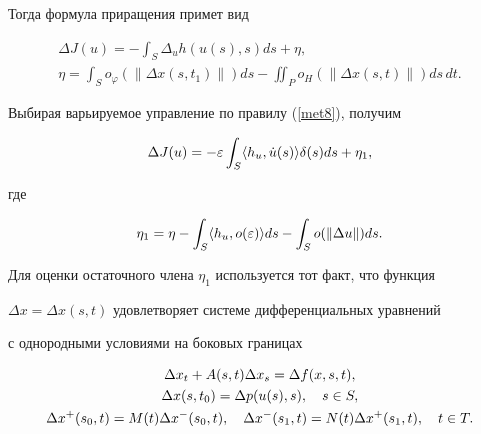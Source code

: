 Тогда формула приращения примет вид


\begin{gather*}


\Delta J(u)=-\int_S \Delta_u h(u(s),s) ds +\eta, \\


%


\eta=\int_S o_\varphi (\| \Delta x(s,t_1) \|) ds -


\iint_P o_H (\|\Delta x (s,t)\| ) ds\, dt.


\end{gather*}





Выбирая варьируемое управление по правилу (\ref{met8}), получим


\begin{equation}


\Delta J(u)=-\varepsilon \int_S \la h_u,\Dot{u} (s)\ra\delta (s) ds + \eta_1,


\label{met11}


\end{equation}


где 


$$


\eta_1=\eta-\int_S \la h_u,o(\varepsilon)\ra ds


-\int_S o( \| \Delta u \| ) ds.


$$





Для оценки остаточного члена $\eta_1$ используется тот факт, что функция


$\Delta x=\Delta x(s,t)$ удовлетворяет системе дифференциальных уравнений


с однородными условиями на боковых границах


\begin{gather}


\Delta x_t +A(s,t)\Delta x_s=\Delta f(x,s,t), \notag\\


\Delta x(s,t_0)=\Delta p(u(s),s), \quad s\in S, \label{met12} \\


%


\Delta x^+ (s_0,t)=M(t)\Delta x^-(s_0,t),\quad


\Delta x^-(s_1,t)=N(t)\Delta x^+(s_1,t), \quad t\in T.\notag


\end{gather}





